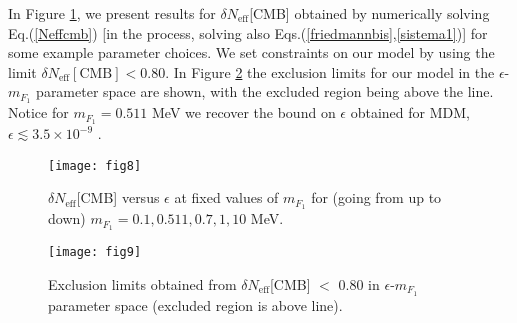 \documentclass[12pt]{article}
\begin{document}

In Figure \ref{fig:Neffcmb}, we present results for $\delta N
_{\text{eff}}$[CMB] obtained by numerically solving 
Eq.(\ref{Neffcmb}) [in the process, solving also
Eqs.(\ref{friedmannbis},\ref{sistema1})] for some example parameter
choices. We set constraints on our model by using the limit $\delta N
_{\text{eff}}[\text{CMB}] < 0.80$. In Figure \ref{fig:Exclusion cmb} the
exclusion limits for our model in the $\epsilon$-$m _{F_1}$ parameter
space are shown, with the excluded region being above the line. Notice
for $m _{F_1} = 0.511$ MeV we recover the bound on $\epsilon$ obtained
for MDM, $\epsilon \lesssim 3.5 \times 10 ^{-9}$ \cite{predictions}.

%
\begin{figure}[htpb]
    \centering
        \texttt{[image: fig8]}
    \caption{$\delta N _{\text{eff}}$[CMB] versus $\epsilon$ at fixed
values of $m_{F_1}$ for (going from up to down) $m_{F_1}=0.1, 0.511,
0.7, 1, 10$ MeV.}
    \label{fig:Neffcmb}
\end{figure}
%
\begin{figure}[htpb]
\vskip -1.2cm
    \centering
        \texttt{[image: fig9]}
    \caption{Exclusion limits obtained from $\delta N
_{\text{eff}}$[CMB] $<$ 0.80 in $\epsilon$-$m_{F_1}$ parameter space
(excluded region is above line).}
    \label{fig:Exclusion cmb}
\end{figure}
%
%
\vskip 3cm
\end{document}
